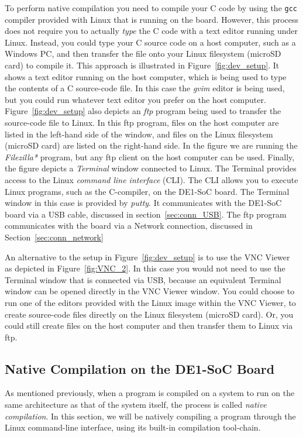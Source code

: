 \documentclass[11pt, twoside, pdftex]{article}
\begin{document}
To perform native compilation you need to compile your C code by using the \texttt{gcc} compiler 
provided with Linux that is running on the board. However, this process does not require you to
actually {\it type} the C code with a text editor running under Linux. Instead, you could type
your C source code on a host computer, such as a Windows PC, and then transfer the file
onto your Linux filesystem (microSD card) to compile it. This approach is illustrated in 
Figure~\ref{fig:dev_setup}. It shows a text editor running on the host computer, which is being
used to type the contents of a C source-code file. In this case the {\it gvim} editor is
being used, but you could run whatever text editor you prefer on the host computer. 
Figure~\ref{fig:dev_setup} also depicts an {\it ftp} program being used to transfer the
source-code file to Linux. In this ftp program, files on the host computer are listed in the 
left-hand side of the window, and files on the Linux filesystem (microSD card) are listed on
the right-hand side. In the figure we are running the {\it Filezilla*} program, but any 
ftp client on the host computer can be used. Finally, the figure depicts a {\it Terminal} 
window connected to Linux. The Terminal provides access to the Linux 
{\it command line interface} (CLI). The CLI allows you to execute Linux programs, such 
as the C-compiler, on the DE1-SoC board. The Terminal window in this case is provided 
by {\it putty}. It communicates with the DE1-SoC board via a USB cable, discussed in 
section~\ref{sec:conn_USB}. The ftp program communicates with the board
via a Network connection, discussed in Section~\ref{sec:conn_network}

An alternative to the setup in Figure~\ref{fig:dev_setup} is to use the VNC Viewer as
depicted in Figure~\ref{fig:VNC_2}. In this case you would not need to use the Terminal
window that is connected via USB, because an equivalent Terminal window can be opened directly
in the VNC Viewer window. You could choose to run one of the editors provided with the
Linux image within the VNC Viewer, to create source-code files directly on the Linux 
filesystem (microSD card). Or, you could still create files on the host computer and then
transfer them to Linux via ftp.

\subsection{Native Compilation on the DE1-SoC Board}
\label{sec:native_compile}

As mentioned previously, when a program is compiled on a system to run on the same architecture
as that of the system itself, the process is called {\it native compilation}. In this section,
we will be natively compiling a program through the Linux command-line interface, using its 
built-in compilation tool-chain.
\end{document}
